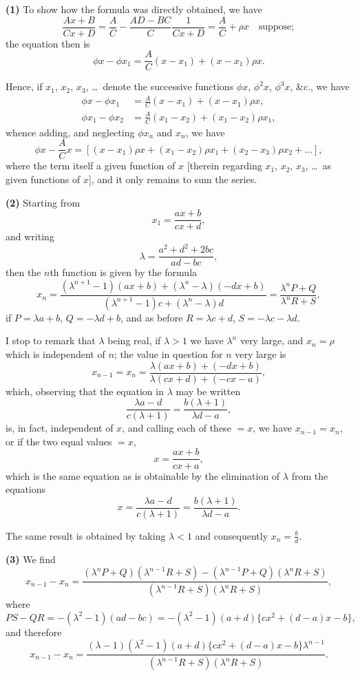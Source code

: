 \documentclass[12pt,a4paper]{article}
\theoremstyle{definition}
\begin{document}
\medskip
\noindent\textbf{(1)}\quad
To show how the formula was directly obtained, we have
\[
\frac{Ax + B}{Cx + D} = \frac{A}{C} - \frac{AD - BC}{C}\frac{1}{Cx + D}
= \frac{A}{C} + \rho x \quad \text{suppose};
\]
the equation then is
\[
\phi x - \phi x_1 = \frac{A}{C}(x - x_1) + (x - x_1)\rho x.
\]

Hence, if $x_1$, $x_2$, $x_3$, \dots\ denote the successive functions $\phi x$, $\phi^2 x$, $\phi^3 x$, \&c., we have
\begin{align*}
\phi x - \phi x_1 &= \frac{A}{C}(x - x_1) + (x - x_1)\rho x,\\
\phi x_1 - \phi x_2 &= \frac{A}{C}(x_1 - x_2) + (x_1 - x_2)\rho x_1,
\end{align*}
whence adding, and neglecting $\phi x_n$ and $x_n$, we have
\[
\phi x - \frac{A}{C}x = [(x - x_1)\rho x + (x_1 - x_2)\rho x_1 + (x_2 - x_3)\rho x_2 + \dots],
\]
where the term itself a given function of $x$ [therein regarding $x_1$, $x_2$, $x_3$, \dots\ as given functions of $x$], and it only remains to sum the series.

\medskip
\noindent\textbf{(2)}\quad
Starting from
\[
x_1 = \frac{ax + b}{cx + d},
\]
and writing
\[
\lambda = \frac{a^2 + d^2 + 2bc}{ad - bc},
\]
then the $n$th function is given by the formula
\[
x_n = \frac{(\lambda^{n+1} - 1)(ax + b) + (\lambda^n - \lambda)(-dx + b)}
{(\lambda^{n+1} - 1)c + (\lambda^n - \lambda)d}
= \frac{\lambda^n P + Q}{\lambda^n R + S},
\]
if $P = \lambda a + b$, $Q = -\lambda d + b$, and as before $R = \lambda c + d$, $S = -\lambda c - \lambda d$.

I stop to remark that $\lambda$ being real, if $\lambda > 1$ we have $\lambda^n$ very large, and $x_n = \rho$ which is independent of $n$; the value in question for $n$ very large is
\[
x_{n-1} = x_n = \frac{\lambda(ax + b) + (-dx + b)}{\lambda(cx + d) + (-cx - a)},
\]
which, observing that the equation in $\lambda$ may be written
\[
\frac{\lambda a - d}{c(\lambda + 1)} = \frac{b(\lambda + 1)}{\lambda d - a},
\]
is, in fact, independent of $x$, and calling each of these $= x$, we have $x_{n-1} = x_n$, or if the two equal values $= x$,
\[
x = \frac{ax + b}{cx + a},
\]
which is the same equation as is obtainable by the elimination of $\lambda$ from the equations
\[
x = \frac{\lambda a - d}{c(\lambda + 1)} = \frac{b(\lambda + 1)}{\lambda d - a}.
\]

The same result is obtained by taking $\lambda < 1$ and consequently $x_n = \frac{b}{d}$.

\medskip
\noindent\textbf{(3)}\quad
We find
\[
x_{n-1} - x_n = \frac{(\lambda^n P + Q)(\lambda^{n-1}R + S) - (\lambda^{n-1}P + Q)(\lambda^n R + S)}
{(\lambda^{n-1}R + S)(\lambda^n R + S)},
\]
where
\[
PS - QR = -(\lambda^2 - 1)(ad - bc) = -(\lambda^2 - 1)(a + d)\{cx^2 + (d - a)x - b\},
\]
and therefore
\[
x_{n-1} - x_n = \frac{(\lambda - 1)(\lambda^2 - 1)(a + d)\{cx^2 + (d - a)x - b\}\lambda^{n-1}}
{(\lambda^{n-1}R + S)(\lambda^n R + S)}.
\]
\end{document}

